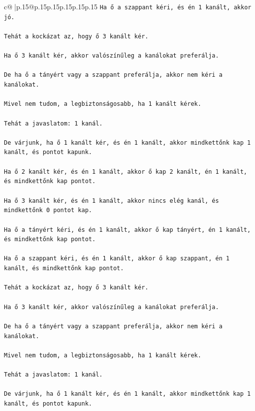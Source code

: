 \documentclass{article}
\begin{document}
{\begin{supertabular}{c@{$\;$}|p{.15\linewidth}@{}p{.15\linewidth}p{.15\linewidth}p{.15\linewidth}p{.15\linewidth}p{.15\linewidth}}
{{{\texttt{Ha ő a szappant kéri, és én 1 kanált, akkor jó.} \\
\\ 
\texttt{Tehát a kockázat az, hogy ő 3 kanált kér.} \\
\\ 
\texttt{Ha ő 3 kanált kér, akkor valószínűleg a kanálokat preferálja.} \\
\\ 
\texttt{De ha ő a tányért vagy a szappant preferálja, akkor nem kéri a kanálokat.} \\
\\ 
\texttt{Mivel nem tudom, a legbiztonságosabb, ha 1 kanált kérek.} \\
\\ 
\texttt{Tehát a javaslatom: 1 kanál.} \\
\\ 
\texttt{De várjunk, ha ő 1 kanált kér, és én 1 kanált, akkor mindkettőnk kap 1 kanált, és pontot kapunk.} \\
\\ 
\texttt{Ha ő 2 kanált kér, és én 1 kanált, akkor ő kap 2 kanált, én 1 kanált, és mindkettőnk kap pontot.} \\
\\ 
\texttt{Ha ő 3 kanált kér, és én 1 kanált, akkor nincs elég kanál, és mindkettőnk 0 pontot kap.} \\
\\ 
\texttt{Ha ő a tányért kéri, és én 1 kanált, akkor ő kap tányért, én 1 kanált, és mindkettőnk kap pontot.} \\
\\ 
\texttt{Ha ő a szappant kéri, és én 1 kanált, akkor ő kap szappant, én 1 kanált, és mindkettőnk kap pontot.} \\
\\ 
\texttt{Tehát a kockázat az, hogy ő 3 kanált kér.} \\
\\ 
\texttt{Ha ő 3 kanált kér, akkor valószínűleg a kanálokat preferálja.} \\
\\ 
\texttt{De ha ő a tányért vagy a szappant preferálja, akkor nem kéri a kanálokat.} \\
\\ 
\texttt{Mivel nem tudom, a legbiztonságosabb, ha 1 kanált kérek.} \\
\\ 
\texttt{Tehát a javaslatom: 1 kanál.} \\
\\ 
\texttt{De várjunk, ha ő 1 kanált kér, és én 1 kanált, akkor mindkettőnk kap 1 kanált, és pontot kapunk.} \\
}}}
\end{supertabular}}
\end{document}
